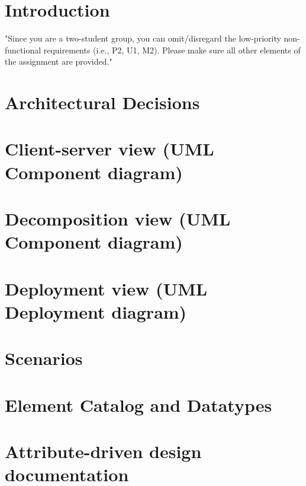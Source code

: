 \documentclass[english]{sareport}
\begin{document}
\maketitle

\tableofcontents
\dominilof
\fakelistoffigures

\chapter{Introduction}\label{ch:introduction}
"Since you are a two-student group, you can omit/disregard the low-priority
non-functional requirements (i.e., P2, U1, M2). Please make sure all other
elements of the assignment are provided."


\chapter{Architectural Decisions}\label{ch:overview}
    
    \clearpage

\chapter{Client-server view (UML Component diagram)}\label{ch:client-server}
    \minilof
    
    \clearpage

\chapter{Decomposition view (UML Component diagram)}\label{ch:decomposition}
    \minilof
    
    \clearpage

\chapter{Deployment view (UML Deployment diagram)}\label{ch:deployment}
    \minilof
    
    \clearpage

\chapter{Scenarios}\label{ch:scenarios}
    \minilof
    

\chapter{Element Catalog and Datatypes}\label{ch:elements-datatypes}
    

\chapter{Attribute-driven design documentation}\label{sec:add}
    
    \newpage
    
    \newpage
\end{document}
